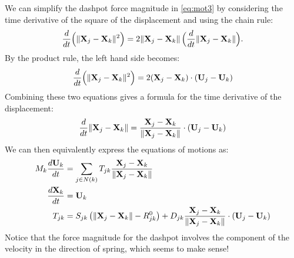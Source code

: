 \documentclass[10pt]{article}
\begin{document}
We can simplify the dashpot force magnitude in \eqref{eq:mot3} by considering the time derivative of the square of the displacement and using the chain rule:
\begin{align*}
\frac{d}{dt} \Big(\|{\bf X}_j - {\bf X}_k\|^2\Big) = 2 \|{\bf X}_j - {\bf X}_k\| \, \Big( \frac{d}{dt} \|{\bf X}_j - {\bf X}_k \| \Big).
\end{align*}  
By the product rule, the left hand side becomes:
\begin{align*}
\frac{d}{dt} \Big(\|{\bf X}_j - {\bf X}_k\|^2\Big) = 2({\bf X}_j - {\bf X}_k) \cdot ({\bf U}_j - {\bf U}_k)
\end{align*}
Combining these two equations gives a formula for the time derivative of the displacement:
\begin{align*}
\frac{d}{dt} \|{\bf X}_j - {\bf X}_k \| = \frac{{\bf X}_j - {\bf X}_k}{\|{\bf X}_j - {\bf X}_k\|} \cdot ({\bf U}_j - {\bf U}_k)
\end{align*}
We can then equivalently express the equations of motions as: 
\begin{align}
\label{eq:mot4}
M_k \frac{d {\bf U}_k}{dt} &= \sum_{j \in N(k)} T_{jk} \frac{{\bf X}_j - {\bf X}_k}{\| {\bf X}_j - {\bf X}_k \|} \\
\label{eq:mot5}
\frac{d {\bf X}_k}{dt} &= {\bf U}_k \\
\label{eq:mot6}
T_{jk} &= S_{jk} \left( \|{\bf X}_j - {\bf X}_k\| - R^0_{jk} \right) + D_{jk} \frac{{\bf X}_j - {\bf X}_k}{\|{\bf X}_j - {\bf X}_k\|} \cdot ({\bf U}_j - {\bf U}_k)
\end{align}
Notice that the force magnitude for the dashpot involves the component of the velocity in the direction of spring, which seems to make sense!
\end{document}
